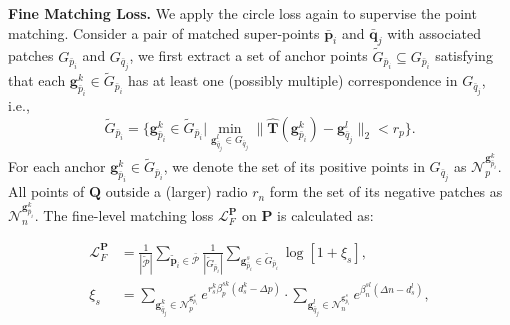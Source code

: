 \noindent\textbf{Fine Matching Loss.}
We apply the circle loss again to supervise the point matching.
Consider a pair of matched super-points $\bar{\bm{p}}_i$ and $\bar{\bm{q}}_j$ with associated patches $G_{\bar{p}_i}$ and $G_{\bar{q}_j}$, we first extract a set of anchor points $\tilde{G}_{\bar{p}_i} \subseteq G_{\bar{p}_i}$ satisfying that each $\bm{g}^k_{\bar{p}_i}\in \tilde{G}_{\bar{p}_i}$ has at least one (possibly multiple) correspondence in $G_{\bar{q}_j}$, i.e.,
\begin{equation*}
\tilde{G}_{\bar{p}_i} = \{\bm{g}^k_{\bar{p}_i}\in \tilde{G}_{\bar{p}_i} |\min_{\bm{g}^l_{\bar{q}_j}\in G_{\bar{q}_j}}\|\hat{\bm{T}}\left(\bm{g}^k_{\bar{p}_i}\right)-\bm{g}^l_{\bar{q}_j}\|_2 < r_p\}.
\end{equation*}
For each anchor $\bm{g}^k_{\bar{p}_i}\in \tilde{G}_{\bar{p}_i}$,  we denote the set of its positive points in $G_{\bar{q}_j}$ as $\mathcal{N}_p^{\bm{g}^k_{\bar{p}_i}}$. All points of $\mathcal{\bm{Q}}$ outside a (larger) radio $r_n$ form the set of its negative patches as $\mathcal{N}_n^{\bm{g}^k_{\bar{p}_i}}$. The fine-level matching loss $\mathcal{L}_{F}^{\mathcal{\bm{P}}}$ on $\mathcal{\bm{P}}$ is calculated as:
\vspace{-2mm}
\begin{scriptsize}
\begin{equation*}
\begin{aligned}
    \mathcal{L}_{F}^{\mathcal{\bm{P}}} &=\frac{1}{|\bm{\tilde{\mathcal{P}}}|}\sum_{\tilde{\bm{p}}_i\in\bm{\bar{\mathcal{P}}}}\frac{1}{|\tilde{G}_{\bar{p}_i}|} \sum_{\bm{g}^s_{\bar{p}_i}\in \tilde{G}_{\bar{p}_i}}\log\left[1+\xi_s\right], \\
    \xi_s &= \sum_{\bm{g}^k_{\bar{q}_j}\in\mathcal{N}_p^{\bm{g}^s_{\bar{p}_i}}}e^{r^k_s\beta_p^{sk}(d_s^k-\Delta p)}\cdot\sum_{\bm{g}^l_{\bar{q}_j}\in\mathcal{N}_n^{\bm{g}^s_{\bar{p}_i}}}e^{\beta_n^{sl}(\Delta n - d_s^l)},
\end{aligned}
\end{equation*}
\end{scriptsize}
